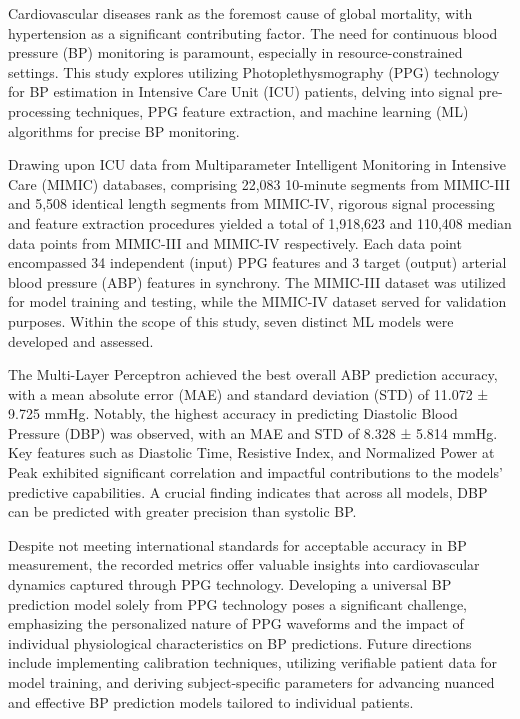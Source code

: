     Cardiovascular diseases rank as the foremost cause of global mortality, with hypertension as a significant contributing factor.
    The need for continuous blood pressure (BP) monitoring is paramount, especially in resource-constrained settings.
    This study explores utilizing Photoplethysmography (PPG) technology for BP estimation in Intensive Care Unit (ICU) patients, delving into signal pre-processing techniques,
    PPG feature extraction, and machine learning (ML) algorithms for precise BP monitoring.

    \vspace{0.4cm}

    Drawing upon ICU data from Multiparameter Intelligent Monitoring in Intensive Care (MIMIC) databases, comprising 22,083 10-minute segments from MIMIC-III and 5,508 identical length segments from MIMIC-IV,
    rigorous signal processing and feature extraction procedures yielded a total of 1,918,623 and 110,408 median data points from MIMIC-III and MIMIC-IV respectively.
    Each data point encompassed 34 independent (input) PPG features and 3 target (output) arterial blood pressure (ABP) features in synchrony.
    The MIMIC-III dataset was utilized for model training and testing, while the MIMIC-IV dataset served for validation purposes.
    Within the scope of this study, seven distinct ML models were developed and assessed.

    \vspace{0.4cm}

    The Multi-Layer Perceptron achieved the best overall ABP prediction accuracy, with a mean absolute error (MAE) and standard deviation (STD) of 11.072 ± 9.725 mmHg.
    Notably, the highest accuracy in predicting Diastolic Blood Pressure (DBP) was observed, with an MAE and STD of 8.328 ± 5.814 mmHg.
    Key features such as Diastolic Time, Resistive Index, and Normalized Power at Peak exhibited significant correlation and impactful contributions to the models' predictive capabilities.
    A crucial finding indicates that across all models, DBP can be predicted with greater precision than systolic BP\@.

    \vspace{0.4cm}

    Despite not meeting international standards for acceptable accuracy in BP measurement, the recorded metrics offer valuable insights into cardiovascular dynamics captured through PPG technology.
    Developing a universal BP prediction model solely from PPG technology poses a significant challenge, emphasizing the personalized nature of PPG waveforms
    and the impact of individual physiological characteristics on BP predictions.
    Future directions include implementing calibration techniques, utilizing verifiable patient data for model training, and deriving subject-specific parameters
    for advancing nuanced and effective BP prediction models tailored to individual patients.